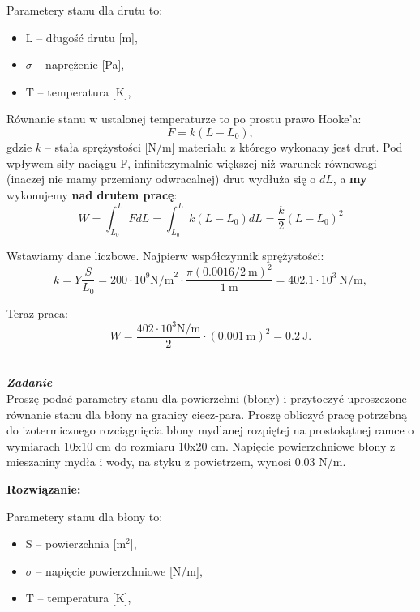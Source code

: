 \documentclass[11pt,a4paper]{article}
\newcounter{zadanie}\newcommand{\zadanie}[1][]{\addtocounter{zadanie}{1} ~\\  {\bf \emph{Zadanie \arabic{zadanie} #1 }} \\}
\renewcommand{\t}[1]{\textrm{#1}}
\begin{document}
Parametery stanu dla drutu to:
\begin{itemize}
	\item L -- długość drutu [m],
	\item $\sigma$ -- naprężenie [Pa],
	\item T -- temperatura [K],
\end{itemize} 

Równanie stanu w ustalonej temperaturze to po prostu prawo Hooke'a:
\begin{equation}
	F = k (L - L_0),
\end{equation}
gdzie $k$ -- stała sprężystości [N/m] materiału z którego wykonany jest drut.
Pod wpływem siły naciągu F, infinitezymalnie większej niż
warunek równowagi (inaczej nie mamy przemiany odwracalnej) 
drut wydłuża się o $dL$, a {\bf my} wykonujemy {\bf nad drutem pracę}:
\begin{equation}
	W =  \int_{L_0}^{L} F dL = 
	     \int_{L_0}^{L} k (L - L_0) dL = 
		 \frac{k}{2} (L - L_0)^2
\end{equation}

Wstawiamy dane liczbowe. Najpierw współczynnik sprężystości:
\begin{equation}
	k = Y \frac{S}{L_0} = 200 \cdot 10^9 \t{N/m}^{2} \cdot 
	    \frac{\pi (0.0016/2~\t{m})^{2}}{1~\t{m}} = 402.1\cdot 10^{3}~\t{N/m},
\end{equation}

Teraz praca:
\begin{equation}
	W = \frac{402 \cdot 10^{3} \t{N/m} }{2} \cdot (0.001~\t{m})^{2} = 0.2~\t{J}.
\end{equation}


\newpage
\zadanie

Proszę podać parametry stanu dla powierzchni (błony) i przytoczyć
uproszczone równanie stanu dla błony na granicy ciecz-para.
Proszę obliczyć pracę potrzebną do izotermicznego rozciągnięcia błony mydlanej 
rozpiętej na prostokątnej ramce o wymiarach 10x10 cm
do rozmiaru 10x20 cm. Napięcie powierzchniowe błony z 
mieszaniny mydła i wody, na styku z powietrzem, wynosi 0.03 N/m.

\vskip 10pt
\textbf{Rozwiązanie:}
\vskip 10pt


Parametery stanu dla błony to:
\begin{itemize}
	\item S -- powierzchnia [m$^{2}$],
	\item $\sigma$ -- napięcie powierzchniowe [N/m],
	\item T -- temperatura [K],
\end{itemize} 
\end{document}
